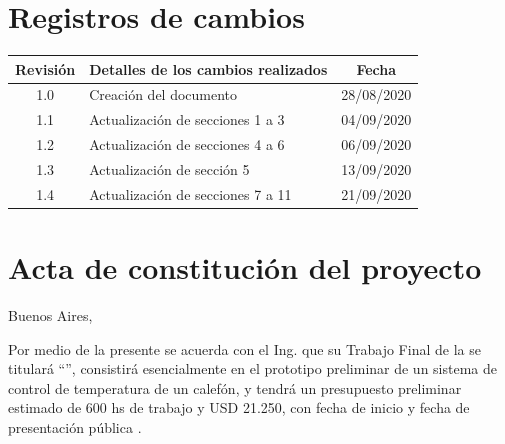 \documentclass[11pt]{charter}
\begin{document}
\maketitle
\thispagestyle{empty}
\pagebreak


\thispagestyle{empty}
{\setlength{\parskip}{0pt}
\tableofcontents{}
}
\pagebreak


\section{Registros de cambios}
\label{sec:registro}


\begin{table}[ht]
\label{tab:registro}
\centering
\begin{tabularx}{\linewidth}{@{}|c|X|c|@{}}
\hline
\rowcolor[HTML]{C0C0C0} 
Revisión & \multicolumn{1}{c|}{\cellcolor[HTML]{C0C0C0}Detalles de los cambios realizados} & Fecha      \\ \hline
1.0      & Creación del documento                                          & 28/08/2020 \\ \hline
1.1      &  Actualización de secciones 1 a 3                           & 04/09/2020 \\ \hline
1.2      & Actualización de secciones 4 a 6                            & 06/09/2020 \\ \hline
1.3      & Actualización de sección 5                            & 13/09/2020 \\ \hline
1.4      & Actualización de secciones 7 a 11                            & 21/09/2020 \\ \hline
\end{tabularx}
\end{table}

\pagebreak



\section{Acta de constitución del proyecto}
\label{sec:acta}

\begin{flushright}
Buenos Aires, \fechaInicioName
\end{flushright}

\vspace{2cm}

Por medio de la presente se acuerda con el Ing. \authorname\hspace{1px} que su Trabajo Final de la \degreename\hspace{1px} se titulará ``\ttitle'', consistirá esencialmente en el prototipo preliminar de un sistema de control de temperatura de un calefón, y tendrá un presupuesto preliminar estimado de 600 hs de trabajo y USD 21.250, con fecha de inicio \fechaInicioName\hspace{1px} y fecha de presentación pública \fechaFinalName.
\end{document}
